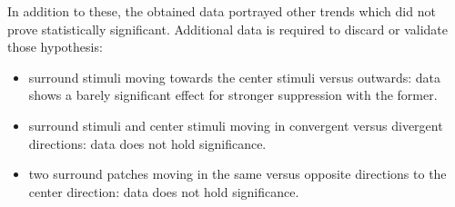 In addition to these, the obtained data portrayed other trends which did not prove statistically significant. Additional data is required to discard or validate those hypothesis:

\begin{itemize}
\item surround stimuli moving towards the center stimuli versus outwards: data shows a barely significant effect for stronger suppression with the former.
\item surround stimuli and center stimuli moving in convergent versus divergent directions: data does not hold significance.
\item two surround patches moving in the same versus opposite directions to the center direction: data does not hold significance.
\end{itemize}
